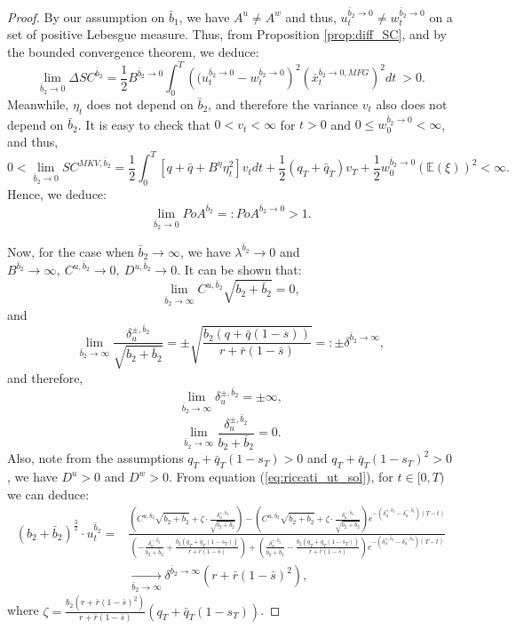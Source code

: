 \documentclass[11pt]{article}
\begin{document}
\begin{proof}
   	By our assumption on $\bar{b}_1$, we have $A^u \neq A^w$ and thus, $u^{\bar{b}_2 \to 0}_t\neq w^{\bar{b}_2 \to 0}_t$ on a set of positive Lebesgue measure. Thus, from Proposition \ref{prop:diff_SC}, and by the bounded convergence theorem, we deduce:
	$$ \lim_{\bar{b}_2 \to 0} \Delta SC^{\bar{b}_2} = \frac{1}{2} B^{\bar{b}_2 \to 0} \int_0^T \left( (u_t^{\bar{b}_2 \to 0} - w_t^{\bar{b}_2 \to 0}\right)^2 \left (\bar{x}_t^{\bar{b}_2 \to 0,MFG} \right)^2 dt \  > 0. $$
	Meanwhile, $\eta_t$ does not depend on $\bar{b}_2$, and therefore the variance $v_t$ also does not depend on $\bar{b}_2$. It is easy to check that $0<v_t<\infty$ for $t>0$ and $0 \leq w^{\bar{b}_2 \to 0}_0 < \infty$, and thus,
	\begin{equation*}
	    0<\lim_{\bar{b}_2 \to 0}SC^{MKV,\bar{b}_2} = \frac{1}{2}\int_0^T \left[q+\bar{q} + B^{\eta} \eta_t^2 \right] v_t dt + \frac{1}{2}(q_T + \bar{q}_T) v_T + \frac{1}{2}w^{\bar{b}_2 \to 0}_0 (\mathbb{E}(\xi))^2<\infty.     
	\end{equation*}
	Hence, we deduce:
	$$ \lim_{\bar{b}_2 \to 0} PoA^{\bar{b}_2} =: PoA^{\bar{b}_2 \to 0} > 1. $$
	
	Now, for the case when $\bar{b}_2 \to \infty$,  we have $\lambda^{\bar{b}_2} \to 0$
	and $B^{\bar{b}_2} \to \infty,\ C^{u,\bar{b}_2} \to 0,\ D^{u,\bar{b}_2} \to 0$. It can be shown that:
	$$\lim_{\bar{b}_2 \to \infty}C^{u,\bar{b}_2}\sqrt{b_2+\bar{b}_2}=0,$$
	and
	$$ \lim_{\bar{b}_2 \to \infty} \frac{\delta^{\pm,\bar{b}_2}_u}{\sqrt{b_2 + \bar{b}_2}} =\pm \sqrt{ \frac{b_2 (q + \bar{q}(1-s))}{r + \bar{r}(1-\bar{s})} } =: \pm \delta^{\bar{b}_2 \to \infty},$$
	and therefore,
	$$\lim_{\bar{b}_2 \to \infty} \delta^{\pm,\bar{b}_2}_u=\pm \infty,$$
	$$\lim_{\bar{b}_2 \to \infty} \frac{\delta^{\pm,\bar{b}_2}_u}{b_2 + \bar{b}_2}=0.$$
	Also, note from the assumptions $q_T+\bar{q}_T(1-s_T)>0$ and $q_T+\bar{q}_T(1-s_T)^2>0$, we have $D^u>0$ and $D^w>0$. From equation (\ref{eq:riccati_ut_sol}), for $t \in [0,T)$ we can deduce:
	\begin{equation*}
	\begin{split}
	 	(b_2 + \bar{b}_2)^{\frac{3}{2}}\cdot u^{\bar{b}_2}_t =& \frac{ \left( C^{u,\bar{b}_2}\sqrt{b_2 + \bar{b}_2} + \zeta \cdot \frac{\delta^{+,\bar{b}_2}_u}{\sqrt{b_2 + \bar{b}_2}}  \right) - \left( C^{u,\bar{b}_2}\sqrt{b_2 + \bar{b}_2} + \zeta \cdot \frac{\delta^{-,\bar{b}_2}_u}{\sqrt{b_2 + \bar{b}_2}}  \right) e^{- (\delta^{+,\bar{b}_2}_u - \delta^{-,\bar{b}_2}_u)(T-t)}}{ \left(- \frac{\delta^{-,\bar{b}_2}_u}{b_2 + \bar{b}_2} + \frac{b_2 (q_T + \bar{q}_T (1-s_T) )}{r + \bar{r}(1-\bar{s})} \right) + \left( \frac{\delta^{+,\bar{b}_2}_u}{b_2 + \bar{b}_2} - \frac{b_2 (q_T + \bar{q}_T (1-s_T) )}{r + \bar{r}(1-\bar{s})} \right)e^{- (\delta^{+,\bar{b}_2}_u - \delta^{-,\bar{b}_2}_u)(T-t)} }\\
	 	& \xrightarrow[\bar{b}_2 \to \infty]{} \delta^{\bar{b}_2 \to \infty} (r + \bar{r}(1-\bar{s})^2),
	 \end{split} 
	\end{equation*}
	where $\zeta = \frac{b_2 (r + \bar{r}(1-\bar{s})^2) }{r+ \bar{r}(1-\bar{s})} (q_T + \bar{q}_T(1-s_T))$. 
	

\end{proof}
\end{document}

